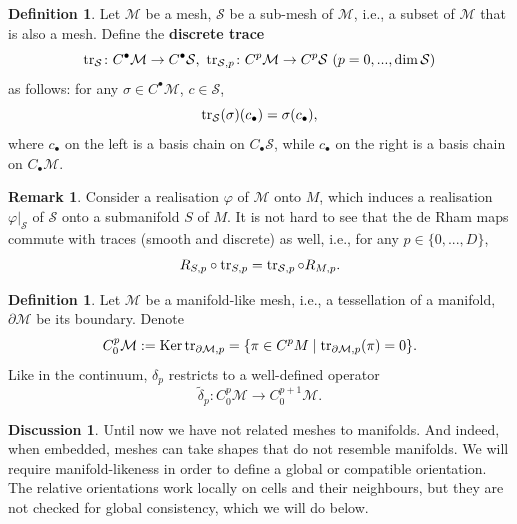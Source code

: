\documentclass{elsarticle}
\theoremstyle{definition}
\newtheorem{definition}[theorem]{Definition}
\newtheorem{discussion}[theorem]{Discussion}
\newtheorem{remark}[theorem]{Remark}
\newcommand{\tr}{\mathop{\rm tr}\nolimits}
\newcommand{\Ker}{\mathop{\rm Ker}\nolimits}
\newcommand{\set}[2]{\{#1 \mid #2\}}
\newcommand{\restrict}[2]{\left.#1\right|_{#2}}
\newcommand{\newterm}[1]{\textbf{#1}}
\begin{document}
\begin{definition}
  Let $\mathcal{M}$ be a mesh,
  $\mathcal{S}$ be a sub-mesh of $\mathcal{M}$, i.e., a subset of $\mathcal{M}$ that is also a mesh.
  Define the \newterm{discrete trace}
  \begin{equation}
    \tr_{\mathcal{S}} \colon C^\bullet \mathcal{M} \to C^\bullet \mathcal{S},\ \tr_{\mathcal{S}, p} \colon C^p \mathcal{M} \to C^p \mathcal{S}\ (p = 0, ..., \dim \mathcal{S})
  \end{equation}
  as follows: for any $\sigma \in C^\bullet \mathcal{M}$, $c \in \mathcal{S}$,
  \begin{equation}
    \tr_{\mathcal{S}}(\sigma)(c_\bullet) = \sigma(c_\bullet),
  \end{equation}
  where $c_\bullet$ on the left is a basis chain on $C_\bullet \mathcal{S}$, while $c_\bullet$ on the right is a basis chain on $C_\bullet \mathcal{M}$.
\end{definition}
\begin{remark}
  Consider a realisation $\varphi$ of $\mathcal{M}$ onto $M$, which induces a realisation $\restrict{\varphi}{\mathcal{S}}$ of $\mathcal{S}$ onto a submanifold $S$ of $M$.
  It is not hard to see that the de Rham maps commute with traces (smooth and discrete) as well, i.e., for any $p \in \{0, ..., D\}$,
  \begin{equation}
    R_{S, p} \circ \tr_{S, p} = \tr_{\mathcal{S}, p} \circ R_{M, p}.
  \end{equation}
\end{remark}
\begin{definition}
  Let $\mathcal{M}$ be a manifold-like mesh, i.e., a tessellation of a manifold, $\partial \mathcal{M}$ be its boundary.
  Denote
  \begin{equation}
    C^p_0 \mathcal{M} := \Ker \tr_{\partial \mathcal{M}, p} = \set{\pi \in C^p M}{\tr_{\partial \mathcal{M}, p}(\pi) = 0}.
  \end{equation}
  Like in the continuum, $\delta_p$ restricts to a well-defined operator
  \begin{equation}
    \tilde{\delta}_p \colon C^p_0 \mathcal{M} \to C^{p + 1}_0 \mathcal{M}.
  \end{equation}
\end{definition}
\begin{discussion}
  Until now we have not related meshes to manifolds.
  And indeed, when embedded, meshes can take shapes that do not resemble manifolds.
  We will require manifold-likeness in order to define a global or compatible orientation.
  The relative orientations work locally on cells and their neighbours, but they are not checked for global consistency, which we will do below.
\end{discussion}
\end{document}
